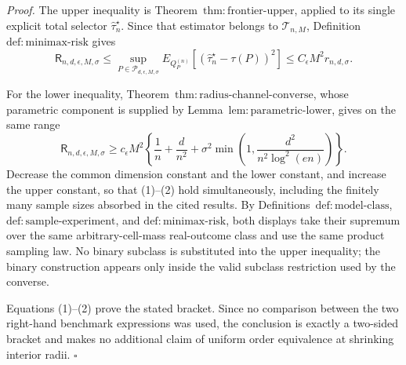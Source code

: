 \textit{Proof.}
The upper inequality is Theorem~\(\mathrm{thm:frontier\text{-}upper}\), applied to its single explicit total selector \(\widehat\tau_n^\star\).  Since that estimator belongs to \(\mathcal T_{n,M}\), Definition~\(\mathrm{def:minimax\text{-}risk}\) gives
\[
 \mathsf R_{n,d,\epsilon,M,\sigma}
 \le
 \sup_{P\in\mathcal P_{d,\epsilon,M,\sigma}}
 E_{Q_P^{(n)}}[(\widehat\tau_n^\star-\tau(P))^2]
 \le C_\epsilon M^2r_{n,d,\sigma}.
\tag{1}
\]

For the lower inequality, Theorem~\(\mathrm{thm:radius\text{-}channel\text{-}converse}\), whose parametric component is supplied by Lemma~\(\mathrm{lem:parametric\text{-}lower}\), gives on the same range
\[
 \mathsf R_{n,d,\epsilon,M,\sigma}
 \ge c_\epsilon M^2\left\{
 \frac1n+\frac d{n^2}
 +\sigma^2\min\left(1,
 \frac{d^2}{n^2\log^2(en)}\right)
 \right\}.
\tag{2}
\]
Decrease the common dimension constant and the lower constant, and increase the upper constant, so that (1)--(2) hold simultaneously, including the finitely many sample sizes absorbed in the cited results.  By Definitions~\(\mathrm{def:model\text{-}class}\), \(\mathrm{def:sample\text{-}experiment}\), and \(\mathrm{def:minimax\text{-}risk}\), both displays take their supremum over the same arbitrary-cell-mass real-outcome class and use the same product sampling law.  No binary subclass is substituted into the upper inequality; the binary construction appears only inside the valid subclass restriction used by the converse.

Equations (1)--(2) prove the stated bracket.  Since no comparison between the two right-hand benchmark expressions was used, the conclusion is exactly a two-sided bracket and makes no additional claim of uniform order equivalence at shrinking interior radii. \(\square\)